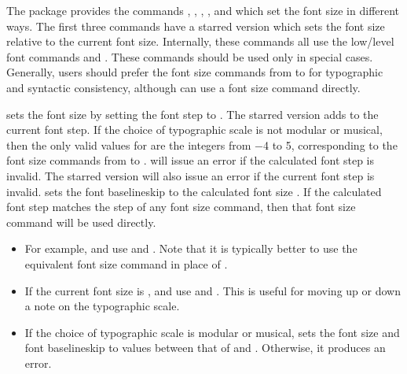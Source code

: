 \documentclass{beery}
\begin{document}
The  package provides the commands , , , , and  which set the font size in different ways.
The first three commands have a starred version which sets the font size relative to the current font size.
Internally, these commands all use the low\-/level font commands  and .
These commands should be used only in special cases.
Generally, users should prefer the font size commands from  to  for typographic and syntactic consistency, although  can use a font size command directly.

\nopagebreak\newline
{}

 sets the font size by setting the font step to .
The starred version  adds  to the current font step.
If the choice of typographic scale is not modular or musical, then the only valid values for  are the integers from \num{-4} to \num{5}, corresponding to the font size commands from  to .
 will issue an error if the calculated font step is invalid.
The starred version  will also issue an error if the current font step is invalid.
 sets the font baselineskip to the calculated font size \texttimes{} .
If the calculated font step matches the step of any font size command, then that font size command will be used directly.

\begin{itemize}
  \item
  For example,  and  use  and .
  Note that it is typically better to use the equivalent font size command in place of .
  \item
  If the current font size is ,  and  use  and .
  This is useful for moving up or down a note on the typographic scale.
  \item
  If the choice of typographic scale is modular or musical,  sets the font size and font baselineskip to values between that of  and .
  Otherwise, it produces an error.
\end{itemize}
\end{document}
